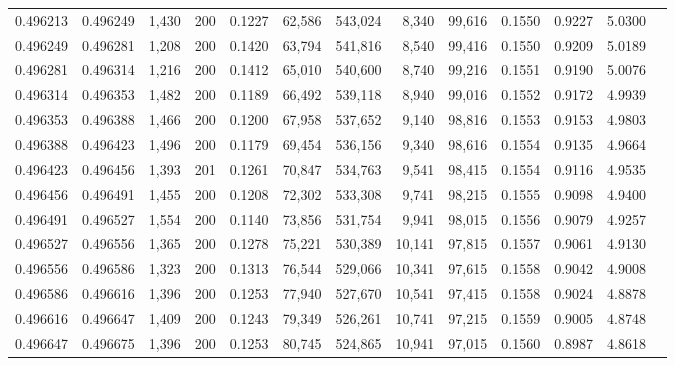\begin{tabular}{rrrrrrrrrrrrr}
0.496213 & 0.496249 & 1,430 & 200 &                                     0.1227 &  62,586 & 543,024 &   8,340 &  99,616 & 0.1550 & 0.9227 & 5.0300 \\
0.496249 & 0.496281 & 1,208 & 200 &                                     0.1420 &  63,794 & 541,816 &   8,540 &  99,416 & 0.1550 & 0.9209 & 5.0189 \\
0.496281 & 0.496314 & 1,216 & 200 &                                     0.1412 &  65,010 & 540,600 &   8,740 &  99,216 & 0.1551 & 0.9190 & 5.0076 \\
0.496314 & 0.496353 & 1,482 & 200 &                                     0.1189 &  66,492 & 539,118 &   8,940 &  99,016 & 0.1552 & 0.9172 & 4.9939 \\
0.496353 & 0.496388 & 1,466 & 200 &                                     0.1200 &  67,958 & 537,652 &   9,140 &  98,816 & 0.1553 & 0.9153 & 4.9803 \\
0.496388 & 0.496423 & 1,496 & 200 &                                     0.1179 &  69,454 & 536,156 &   9,340 &  98,616 & 0.1554 & 0.9135 & 4.9664 \\
0.496423 & 0.496456 & 1,393 & 201 &                                     0.1261 &  70,847 & 534,763 &   9,541 &  98,415 & 0.1554 & 0.9116 & 4.9535 \\
0.496456 & 0.496491 & 1,455 & 200 &                                     0.1208 &  72,302 & 533,308 &   9,741 &  98,215 & 0.1555 & 0.9098 & 4.9400 \\
0.496491 & 0.496527 & 1,554 & 200 &                                     0.1140 &  73,856 & 531,754 &   9,941 &  98,015 & 0.1556 & 0.9079 & 4.9257 \\
0.496527 & 0.496556 & 1,365 & 200 &                                     0.1278 &  75,221 & 530,389 &  10,141 &  97,815 & 0.1557 & 0.9061 & 4.9130 \\
0.496556 & 0.496586 & 1,323 & 200 &                                     0.1313 &  76,544 & 529,066 &  10,341 &  97,615 & 0.1558 & 0.9042 & 4.9008 \\
0.496586 & 0.496616 & 1,396 & 200 &                                     0.1253 &  77,940 & 527,670 &  10,541 &  97,415 & 0.1558 & 0.9024 & 4.8878 \\
0.496616 & 0.496647 & 1,409 & 200 &                                     0.1243 &  79,349 & 526,261 &  10,741 &  97,215 & 0.1559 & 0.9005 & 4.8748 \\
0.496647 & 0.496675 & 1,396 & 200 &                                     0.1253 &  80,745 & 524,865 &  10,941 &  97,015 & 0.1560 & 0.8987 & 4.8618 \\

\end{tabular}
